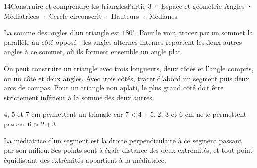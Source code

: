 \begin{ouverture}[geometrie]{14}{Construire et comprendre les triangles}{Partie 3 · Espace et géométrie}
{Angles · Médiatrices · Cercle circonscrit · Hauteurs · Médianes}
\end{ouverture}
\pagestyle{otMain}\essentiel\fontsize{11}{15}\selectfont
{}\label{cours-14-1}
\begin{propriete}La somme des angles d’un triangle est $180^\circ$. Pour le voir, tracer par un sommet la parallèle au côté opposé : les angles alternes internes reportent les deux autres angles à ce sommet, où ils forment ensemble un angle plat.\end{propriete}
\label{fig-cours-14-1-cours-triangle-angles}

\begin{savoirfaire}On peut construire un triangle avec trois longueurs, deux côtés et l’angle compris, ou un côté et deux angles. Avec trois côtés, tracer d’abord un segment puis deux arcs de compas. Pour un triangle non aplati, le plus grand côté doit être strictement inférieur à la somme des deux autres.\end{savoirfaire}
\begin{exemple}4, 5 et 7 cm permettent un triangle car $7<4+5$. 2, 3 et 6 cm ne le permettent pas car $6>2+3$.\end{exemple}
\clearpage
{}\label{cours-14-2}
\begin{definition}La médiatrice d’un segment est la droite perpendiculaire à ce segment passant par son milieu. Ses points sont à égale distance des deux extrémités, et tout point équidistant des extrémités appartient à la médiatrice.\end{definition}
\label{fig-cours-14-2-cours-cercle-circonscrit}


